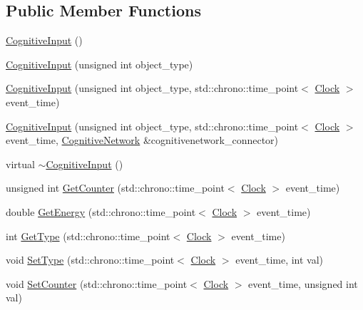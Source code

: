 \subsection*{Public Member Functions}
\begin{DoxyCompactItemize}
\item 
\mbox{\hyperlink{classCognitiveInput_a5c3c102dc3ec6cfec25eb849488e9782}{Cognitive\+Input}} ()
\item 
\mbox{\hyperlink{classCognitiveInput_a220c07f5be517afe47b4d3c486c4152e}{Cognitive\+Input}} (unsigned int object\+\_\+type)
\item 
\mbox{\hyperlink{classCognitiveInput_a31cc06426ab41c39ec8c795ab29d43de}{Cognitive\+Input}} (unsigned int object\+\_\+type, std\+::chrono\+::time\+\_\+point$<$ \mbox{\hyperlink{universe_8h_a0ef8d951d1ca5ab3cfaf7ab4c7a6fd80}{Clock}} $>$ event\+\_\+time)
\item 
\mbox{\hyperlink{classCognitiveInput_a230ebb8f019af7e0bff51c13bc10c580}{Cognitive\+Input}} (unsigned int object\+\_\+type, std\+::chrono\+::time\+\_\+point$<$ \mbox{\hyperlink{universe_8h_a0ef8d951d1ca5ab3cfaf7ab4c7a6fd80}{Clock}} $>$ event\+\_\+time, \mbox{\hyperlink{classCognitiveNetwork}{Cognitive\+Network}} \&cognitivenetwork\+\_\+connector)
\item 
virtual \mbox{\hyperlink{classCognitiveInput_a68007661b8fdd7ef39213a1fb3c06bd7}{$\sim$\+Cognitive\+Input}} ()
\item 
unsigned int \mbox{\hyperlink{classCognitiveInput_a695e7e57b717210b64f9e2c4e26c8044}{Get\+Counter}} (std\+::chrono\+::time\+\_\+point$<$ \mbox{\hyperlink{universe_8h_a0ef8d951d1ca5ab3cfaf7ab4c7a6fd80}{Clock}} $>$ event\+\_\+time)
\item 
double \mbox{\hyperlink{classCognitiveInput_a9bdb43198c1a36b97a6da125331bc927}{Get\+Energy}} (std\+::chrono\+::time\+\_\+point$<$ \mbox{\hyperlink{universe_8h_a0ef8d951d1ca5ab3cfaf7ab4c7a6fd80}{Clock}} $>$ event\+\_\+time)
\item 
int \mbox{\hyperlink{classCognitiveInput_a0ad0919c7280b268493b27892bd7c784}{Get\+Type}} (std\+::chrono\+::time\+\_\+point$<$ \mbox{\hyperlink{universe_8h_a0ef8d951d1ca5ab3cfaf7ab4c7a6fd80}{Clock}} $>$ event\+\_\+time)
\item 
void \mbox{\hyperlink{classCognitiveInput_a37d38512fb190431b4baf8f990c077a9}{Set\+Type}} (std\+::chrono\+::time\+\_\+point$<$ \mbox{\hyperlink{universe_8h_a0ef8d951d1ca5ab3cfaf7ab4c7a6fd80}{Clock}} $>$ event\+\_\+time, int val)
\item 
void \mbox{\hyperlink{classCognitiveInput_a4f09c1f176b5406d95a14d7cb1ab75e6}{Set\+Counter}} (std\+::chrono\+::time\+\_\+point$<$ \mbox{\hyperlink{universe_8h_a0ef8d951d1ca5ab3cfaf7ab4c7a6fd80}{Clock}} $>$ event\+\_\+time, unsigned int val)

\end{DoxyCompactItemize}
